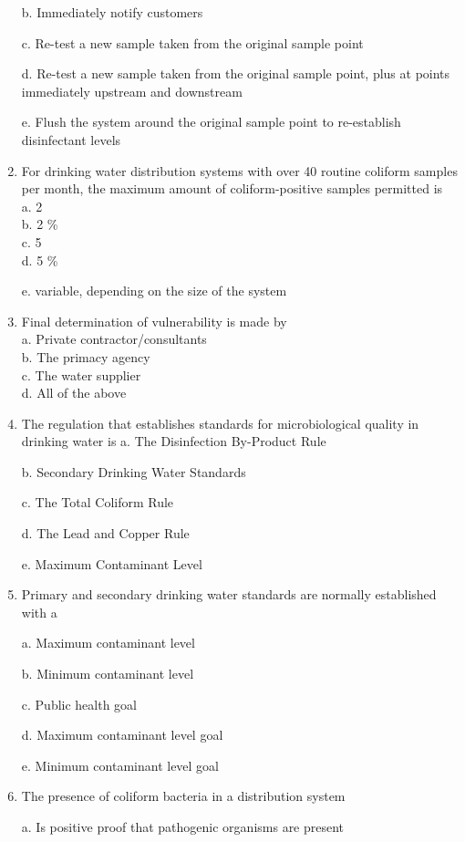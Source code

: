 \begin{enumerate}
b. Immediately notify customers

c. Re-test a new sample taken from the original sample point

d. Re-test a new sample taken from the original sample point, plus at points immediately upstream and downstream

e. Flush the system around the original sample point to re-establish disinfectant levels

 \item For drinking water distribution systems with over 40 routine coliform samples per month, the maximum amount of coliform-positive samples permitted is\\
a. 2\\
b. 2 \%\\
c. 5\\
d. 5 \%

e. variable, depending on the size of the system

\item Final determination of vulnerability is made by\\
a. Private contractor/consultants\\
b. The primacy agency\\
c. The water supplier\\
d. All of the above\\

  \item The regulation that establishes standards for microbiological quality in drinking water is
a. The Disinfection By-Product Rule

b. Secondary Drinking Water Standards

c. The Total Coliform Rule

d. The Lead and Copper Rule

e. Maximum Contaminant Level


  \item Primary and secondary drinking water standards are normally established with a

a. Maximum contaminant level

b. Minimum contaminant level

c. Public health goal

d. Maximum contaminant level goal

e. Minimum contaminant level goal

\item The presence of coliform bacteria in a distribution system

a. Is positive proof that pathogenic organisms are present


\end{enumerate}
